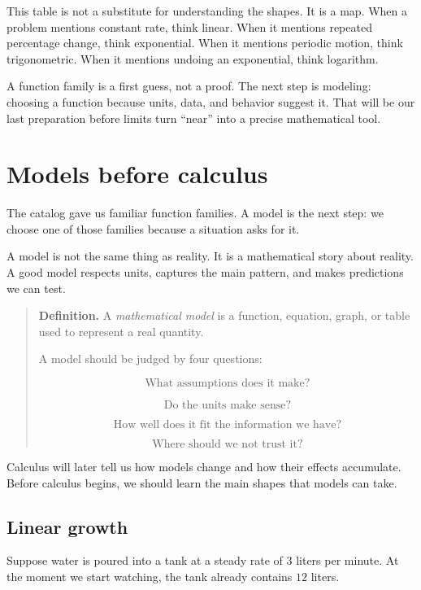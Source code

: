 This table is not a substitute for understanding the shapes. It is a map. When a problem mentions constant rate, think linear. When it mentions repeated percentage change, think exponential. When it mentions periodic motion, think trigonometric. When it mentions undoing an exponential, think logarithm.

A function family is a first guess, not a proof. The next step is modeling: choosing a function because units, data, and behavior suggest it. That will be our last preparation before limits turn ``near'' into a precise mathematical tool.
\section{Models before calculus}
\label{sec:models-before-calculus}

The catalog gave us familiar function families. A model is the next step: we choose one of those families because a situation asks for it.

A model is not the same thing as reality. It is a mathematical story about reality. A good model respects units, captures the main pattern, and makes predictions we can test.

\begin{quote}
\textbf{Definition.}
A \emph{mathematical model} is a function, equation, graph, or table used to represent a real quantity.

A model should be judged by four questions:

\[
\text{What assumptions does it make?}
\]

\[
\text{Do the units make sense?}
\]

\[
\text{How well does it fit the information we have?}
\]

\[
\text{Where should we not trust it?}
\]
\end{quote}

Calculus will later tell us how models change and how their effects accumulate. Before calculus begins, we should learn the main shapes that models can take.

\subsection{Linear growth}
\label{subsec:linear-growth-models}

Suppose water is poured into a tank at a steady rate of \(3\) liters per minute. At the moment we start watching, the tank already contains \(12\) liters.

